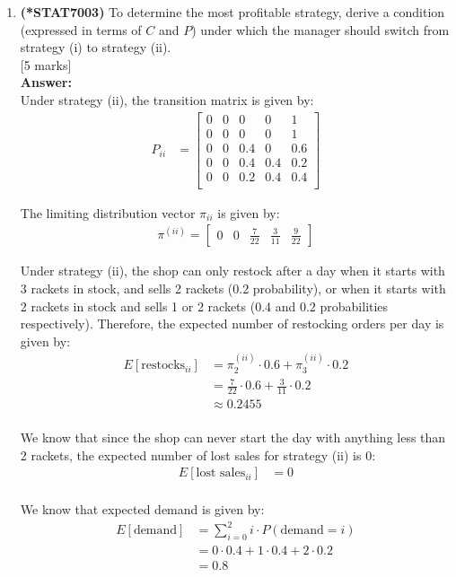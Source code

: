 \documentclass[12pt]{article}
\begin{document}
\begin{enumerate}
\begin{enumerate}
\item {\bf (*STAT7003)} To determine the most profitable strategy, derive a condition (expressed in terms of $C$ and $P$) under which the manager should switch from strategy (i) to strategy (ii).   
			\\\phantom{1}\hfill [5 marks] 
%
\\
\textbf{Answer:}
\\

Under strategy (ii), the transition matrix is given by:
\begin{align*}
P_{ii} &= \begin{bmatrix}
0 & 0 & 0 & 0 & 1 \\
0 & 0 & 0 & 0 & 1 \\
0 & 0 & 0.4 & 0 & 0.6 \\
0 & 0 & 0.4 & 0.4 & 0.2 \\
0 & 0 & 0.2 & 0.4 & 0.4 \\
\end{bmatrix}
\end{align*}

The limiting distribution vector $\pi_{ii}$ is given by:
\begin{align*}
\pi^{(ii)} = 
\begin{bmatrix}
0 & 0 & \frac{7}{22} & \frac{3}{11} & \frac{9}{22}
\end{bmatrix}
\end{align*}

Under strategy (ii), the shop can only restock after a day when it starts with 3 rackets in stock, and sells 2 rackets (0.2 probability), or when it starts with 2 rackets in stock and sells 1 or 2 rackets (0.4 and 0.2 probabilities respectively). Therefore, the expected number of restocking orders per day is given by:
\begin{align*}
E[\text{restocks}_{ii}] &= \pi^{(ii)}_2 \cdot 0.6 + \pi^{(ii)}_3 \cdot 0.2 \\
&= \frac{7}{22} \cdot 0.6 + \frac{3}{11} \cdot 0.2 \\
&\approx 0.2455 \\
\end{align*}

We know that since the shop can never start the day with anything less than 2 rackets, the expected number of lost sales for strategy (ii) is 0:
\begin{align*}
E[\text{lost sales}_{ii}] &= 0 \\
\end{align*}

We know that expected demand is given by:
\begin{align*}
E[\text{demand}] &= \sum_{i=0}^{2} i \cdot P(\text{demand} = i) \\
&= 0 \cdot 0.4 + 1 \cdot 0.4 + 2 \cdot 0.2 \\
&= 0.8 \\
\end{align*}


\end{enumerate}
\end{enumerate}
\end{document}
